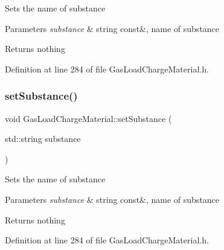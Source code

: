 Sets the name of substance


\begin{DoxyParams}{Parameters}
{\em substance} & string const\&, name of substance\\
\hline
\end{DoxyParams}
\begin{DoxyReturn}{Returns}
nothing 
\end{DoxyReturn}


Definition at line 284 of file Gas\+Load\+Charge\+Material.\+h.

\mbox{\label{class_gas_load_charge_material_a20cc3df601d8daae9b8f8e7b0c53c2e3}} 
\subsubsection{\texorpdfstring{set\+Substance()}{setSubstance()}\hspace{0.1cm}{\footnotesize\ttfamily [3/3]}}
{\footnotesize\ttfamily void Gas\+Load\+Charge\+Material\+::set\+Substance (\begin{DoxyParamCaption}\item[{std\+::string}]{substance }\end{DoxyParamCaption})\hspace{0.3cm}{\ttfamily [inline]}}

Sets the name of substance


\begin{DoxyParams}{Parameters}
{\em substance} & string const\&, name of substance\\
\hline
\end{DoxyParams}
\begin{DoxyReturn}{Returns}
nothing 
\end{DoxyReturn}


Definition at line 284 of file Gas\+Load\+Charge\+Material.\+h.

\mbox{\label{class_gas_load_charge_material_ac48eb07a3008f1dc0ff433353b59536d}} 
